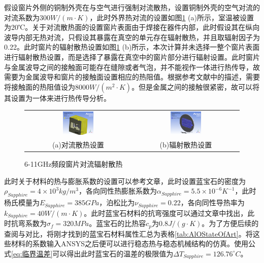 \documentclass[master]{thesis-uestc}
\begin{document}
假设窗片外侧的铜制外壳在与空气进行强制对流散热，设置铜制外壳的空气对流的对流系数为\(300 W/ (m \cdot K)\)，此时外界热对流的设置如图\ref{fig:X频段窗片对流辐射散热} (a)所示，室温被设置为20℃。关于对流散热面的设置窗片表面由于焊接在器件内部，此时假设其在纵向波导内部无热对流，只假设其暴露在真空的单元存在辐射散热，并且取辐射因子为0.22。此时窗片的辐射散热设置如图\ref{fig:X频段窗片对流辐射散热} (b)所示，本次计算并未选择一整个窗片表面进行辐射散热设置，而是选择了暴露在真空中的窗片部分进行辐射设置。此时窗片与金属波导之间的接触面可能存在缝隙或者气泡，并不能视作一体进行热传导，故需要为金属波导和窗片的接触面设置相应的热阻值。根据参考文献\cite{jiang_2022_design}中的描述，需要将接触面的热阻值设为8000\(W / (m^2 \cdot K)\)。但是金属之间的接触很紧密，故可以将其设置为一体来进行热传导分析。
\begin{figure}[!htb]
    \small
    \centering
    \begin{tabular}{@{\ }c@{\ }c}
        \includegraphics[width=0.3\textwidth]{pic/chapter3/窗片对流系数.png} & 
        \hspace{5pt}
        \includegraphics[width=0.3\textwidth]{pic/chapter3/辐射单元选择.png}     \\
        \mbox{\small (a)对流散热设置}                                                                               & 
        \mbox{\small (b)辐射散热设置}                                                                                  \\
    \end{tabular}
    \caption{6-11GHz频段窗片对流辐射散热}
    \label{fig:X频段窗片对流辐射散热}
\end{figure}

此时关于材料的热与膨胀系数的设置可以参考文章\cite{thumm_stateart_2020}，此时设置蓝宝石的密度为\( \rho_{Sapphire}= 4 \times 10^3 kg/ m^3\)，各向同性热膨胀系数为\(\alpha_{Sapphire} = 5.5 \times 10 ^{-6}K^{-1}\)，此时杨氏模量为\( E_{Sapphire}= 385 GPa \)，泊松比为\( \nu_{Sapphire}= 0.22 \)，各向同性导热率为\(k_{Sapphire} =40 W/(m \cdot K)\)。此时蓝宝石材料的抗弯强度可以通过文章\cite{hanyong_diff_2011}中找出，此时抗弯系数为\(\sigma_{f} = 320MPa\)。蓝宝石的比热容\(c_p\)为\(0.8 J/ (g \cdot K)\)。为了方便后续的查阅与对比，将刚才找到的蓝宝石材料属性汇总为表格\ref{tab:AlOStateOfArt}。将这些材料的系数输入ANSYS之后便可以进行稳态热与稳态机械结构的仿真。使用公式\ref{eq:临界温差}可以得出此时蓝宝石的温差的极限值为\(\Delta T_{Sapphire} = 126.76 ^\circ C\)。
\end{document}

